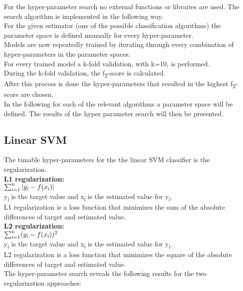 For the hyper-parameter search no external functions or libraries are used. The search algorithm is implemented in the following way.\\ For the given estimator (one of the possible classification algorithms) the parameter space is defined manually for every hyper-parameter.\\
Models are now repeatedly trained by iterating through every combination of hyper-parameters in the parameter spaces.\\
For every trained model a  k-fold validation, with k=10, is performed.\\
During the k-fold validation, the f\textsubscript{2}-score is calculated.\\
After this process is done the hyper-parameters that resulted in the highest f\textsubscript{2}-score are chosen.\\
In the following for each of the relevant algorithms a parameter space will be defined. The results of the hyper parameter search will then be presented.

\subsection*{Linear SVM}
The tunable hyper-parameters for the the linear SVM classifier is the regularization. \\
\textbf{L1 regularization:}\\
$\sum_{i=1}^{n}|y\textsubscript{i}-f(x\textsubscript{i})| $ \\
 y\textsubscript{i} is the target value and x\textsubscript{i} is the estimated value for y\textsubscript{i}.\\
 L1 regularization is a loss function that minimizes the sum of the absolute differences of target and estimated value.
\\
\textbf{L2 regularization:}  \\
$\sum_{i=1}^{n}(y\textsubscript{i}-f(x\textsubscript{i}))^2 $ \\
 y\textsubscript{i} is the target value and x\textsubscript{i} is the estimated value for  y\textsubscript{i}.\\
 L2 regularization is a loss function that minimizes the square of the absolute differences of target and estimated value.
\\

The hyper-parameter search reveals the following results for the two regularization approaches: \\


